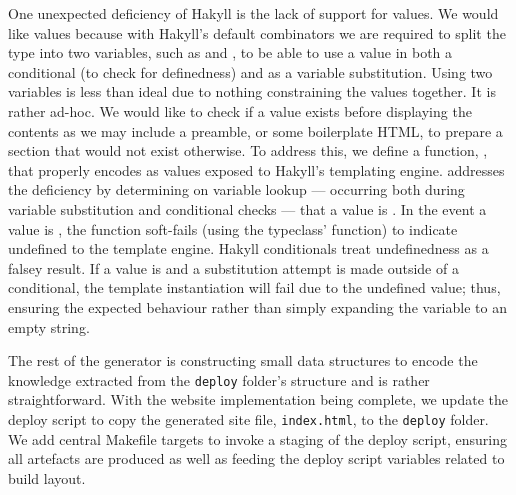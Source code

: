 {{{{{One unexpected deficiency of Hakyll is the lack of support for  values. We would like  values because with Hakyll's default combinators we are required to split the  type into two variables, such as  and , to be able to use a value in both a conditional (to check for definedness) and as a variable substitution. Using two variables is less than ideal due to nothing constraining the values together. It is rather ad-hoc. We would like to check if a value exists before displaying the contents as we may include a preamble, or some boilerplate HTML, to prepare a section that would not exist otherwise. To address this, we define a function, , that properly encodes  as values exposed to Hakyll's templating engine.  addresses the deficiency by determining on variable lookup --- occurring both during variable substitution and conditional checks --- that a value is . In the event a value is , the function soft-fails (using the  typeclass'  function) to indicate undefined to the template engine. Hakyll conditionals treat undefinedness as a falsey result. If a value is  and a substitution attempt is made outside of a conditional, the template instantiation will fail due to the undefined value; thus, ensuring the expected behaviour rather than simply expanding the variable to an empty string.

The rest of the generator is constructing small data structures to encode the knowledge extracted from the \texttt{deploy} folder's structure and is rather straightforward. With the website implementation being complete, we update the deploy script to copy the generated site file, \texttt{index.html}, to the \texttt{deploy} folder. We add central Makefile targets to invoke a staging of the deploy script, ensuring all artefacts are produced as well as feeding the deploy script variables related to build layout.

}}}}}
